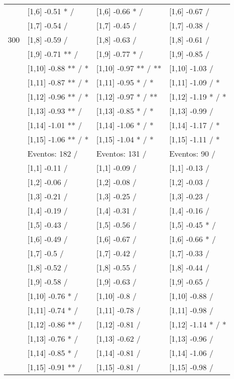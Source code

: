 \begin{table}
\begin{tabular}[t]{llll}
 & {}[1,6] -0.51 * / & {}[1,6] -0.66 * / & {}[1,6] -0.67  /\\
 & {}[1,7] -0.54  / & {}[1,7] -0.45  / & {}[1,7] -0.38  /\\
300 & {}[1,8] -0.59  / & {}[1,8] -0.63  / & {}[1,8] -0.61  /\\
\addlinespace
 & {}[1,9] -0.71 ** / & {}[1,9] -0.77 * / & {}[1,9] -0.85  /\\
 & {}[1,10] -0.88 ** / * & {}[1,10] -0.97 ** / ** & {}[1,10] -1.03  /\\
 & {}[1,11] -0.87 ** / * & {}[1,11] -0.95 * / * & {}[1,11] -1.09  / *\\
 & {}[1,12] -0.96 ** / * & {}[1,12] -0.97 * / ** & {}[1,12] -1.19 * / *\\
 & {}[1,13] -0.93 ** / & {}[1,13] -0.85 * / * & {}[1,13] -0.99  /\\
\addlinespace
 & {}[1,14] -1.01 ** / & {}[1,14] -1.06 * / * & {}[1,14] -1.17  / *\\
 & {}[1,15] -1.06 ** / * & {}[1,15] -1.04 * / * & {}[1,15] -1.11  / *\\
 & Eventos:  182 / & Eventos:  131 / & Eventos:  90 /\\
 & {}[1,1] -0.11  / & {}[1,1] -0.09  / & {}[1,1] -0.13  /\\
 & {}[1,2] -0.06  / & {}[1,2] -0.08  / & {}[1,2] -0.03  /\\
\addlinespace
 & {}[1,3] -0.21  / & {}[1,3] -0.25  / & {}[1,3] -0.23  /\\
 & {}[1,4] -0.19  / & {}[1,4] -0.31  / & {}[1,4] -0.16  /\\
 & {}[1,5] -0.43  / & {}[1,5] -0.56  / & {}[1,5] -0.45 * /\\
 & {}[1,6] -0.49  / & {}[1,6] -0.67  / & {}[1,6] -0.66 * /\\
 & {}[1,7] -0.5  / & {}[1,7] -0.42  / & {}[1,7] -0.33  /\\
\addlinespace
500 & {}[1,8] -0.52  / & {}[1,8] -0.55  / & {}[1,8] -0.44  /\\
 & {}[1,9] -0.58  / & {}[1,9] -0.63  / & {}[1,9] -0.65  /\\
 & {}[1,10] -0.76 * / & {}[1,10] -0.8  / & {}[1,10] -0.88  /\\
 & {}[1,11] -0.74 * / & {}[1,11] -0.78  / & {}[1,11] -0.98  /\\
 & {}[1,12] -0.86 ** / & {}[1,12] -0.81  / & {}[1,12] -1.14 * / *\\
\addlinespace
 & {}[1,13] -0.76 * / & {}[1,13] -0.62  / & {}[1,13] -0.96  /\\
 & {}[1,14] -0.85 * / & {}[1,14] -0.81  / & {}[1,14] -1.06  /\\
 & {}[1,15] -0.91 ** / & {}[1,15] -0.81  / & {}[1,15] -0.98  /\\
\bottomrule
\end{tabular}
\end{table}
